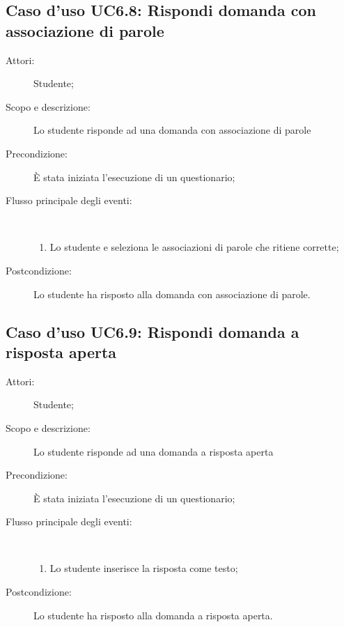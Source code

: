 \subsection{Caso d'uso UC6.8: Rispondi domanda con associazione di parole}\begin{description}
	\item[Attori:] Studente;
	\item[Scopo e descrizione:] Lo studente risponde ad una domanda con associazione di parole
	\item[Precondizione:] È stata iniziata l'esecuzione di un questionario;
	
	\item[Flusso principale degli eventi:] \ 
	\begin{enumerate}
		\item Lo studente e seleziona le associazioni di parole che ritiene corrette;
		
	\end{enumerate}
	\item[Postcondizione:] Lo studente ha risposto alla domanda con associazione di parole.
\end{description}
\hypertarget{UC6.9}{}
\subsection{Caso d'uso UC6.9: Rispondi domanda a risposta aperta}\begin{description}
	\item[Attori:] Studente;
	\item[Scopo e descrizione:] Lo studente risponde ad una domanda a risposta aperta
	\item[Precondizione:] È stata iniziata l'esecuzione di un questionario;
	
	\item[Flusso principale degli eventi:] \ 
	\begin{enumerate}
		\item Lo studente inserisce la risposta come testo;
		
	\end{enumerate}
	\item[Postcondizione:] Lo studente ha risposto alla domanda a risposta aperta.
\end{description}
\hypertarget{UC6.10}{}

